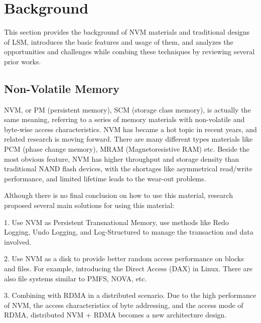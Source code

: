
\section{Background}
This section provides the background of NVM materials and traditional designs of LSM, introduces the basic features and usage of them, and analyzes the opportunities and challenges while combing these techniques by reviewing several prior works.

\subsection{Non-Volatile Memory}
NVM, or PM (persistent memory), SCM (storage class memory), is actually the same meaning, referring to a series of memory materials with non-volatile and byte-wise access characteristics. NVM has became a hot topic in recent years, and related research is moving forward. There are many different types materials like PCM (phase change memory), MRAM (Magnetoresistive RAM) etc. Beside the most obvious feature, NVM has higher throughput and storage density than traditional NAND flash devices, with the shortages like asymmetrical read/write performance, and limited lifetime leads to the wear-out problems.


Although there is no final conclusion on how to use this material, research proposed several main solutions for using this material: 

1. Use NVM as Persistent Transnational Memory, use methods like Redo Logging, Undo Logging, and Log-Structured to manage the transaction and data involved. 

2. Use NVM as a disk to provide better random access performance on blocks and files. For example, introducing the Direct Access (DAX) in Linux. There are also file systems\cite{dulloor2014system} similar to PMFS, NOVA\cite{xu2016nova}, etc.

3. Combining with RDMA in a distributed scenario. Due to the high performance of NVM, the access characteristics of byte addressing, and the access mode of RDMA, distributed NVM + RDMA becomes a new architecture design.


